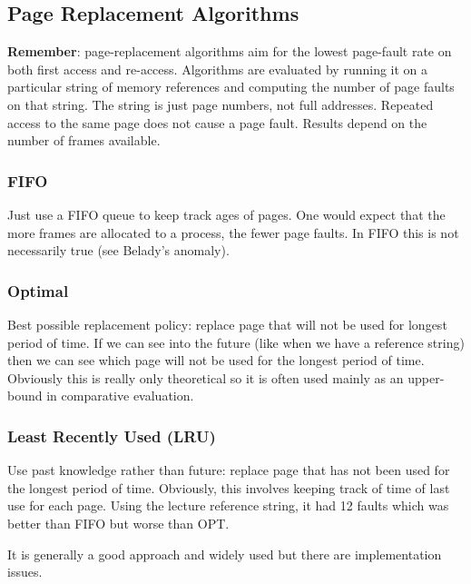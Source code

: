 \documentclass{article}%
\begin{document}
\subsection{Page Replacement Algorithms}
\label{sec:org2388eb0}
\textbf{Remember}: page-replacement algorithms aim for the lowest page-fault rate on both first access and re-access.
Algorithms are evaluated by running it on a particular string of memory references and computing the number of page faults on that string.
The string is just page numbers, not full addresses.
Repeated access to the same page does not cause a page fault.
Results depend on the number of frames available.

\subsubsection{FIFO}
\label{sec:orgf91c936}
Just use a FIFO queue to keep track ages of pages.
One would expect that the more frames are allocated to a process, the fewer page faults.
In FIFO this is not necessarily true (see Belady's anomaly).

\subsubsection{Optimal}
\label{sec:org16609fc}
Best possible replacement policy: replace page that will not be used for longest period of time.
If we can see into the future (like when we have a reference string) then we can see which page will not be used for the longest period of time.
Obviously this is really only theoretical so it is often used mainly as an upper-bound in comparative evaluation.

\subsubsection{Least Recently Used (LRU)}
\label{sec:org667c3e1}
Use past knowledge rather than future: replace page that has not been used for the longest period of time.
Obviously, this involves keeping track of time of last use for each page.
Using the lecture reference string, it had 12 faults which was better than FIFO but worse than OPT.

It is generally a good approach and widely used but there are implementation issues.
\end{document}
